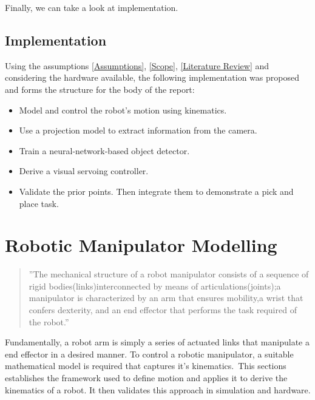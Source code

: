 \documentclass{UoNMCHA}
\numberwithin{equation}{section}
\begin{document}
Finally, we can take a look at implementation.
	
\subsection{Implementation}	

	Using the assumptions \ref{Assumptions}, \ref{Scope}, \ref{Literature Review} and considering the hardware available, the following implementation was proposed and forms the structure for the body of the report:
	
	\begin{itemize}
		\item Model and control the robot's motion using kinematics.
		\item Use a projection model to extract information from the camera.
		\item Train a neural-network-based object detector.
		\item Derive a visual servoing controller.
		\item Validate the prior points. Then integrate them to demonstrate a pick and place task.
	\end{itemize}
	

\newpage
\section{Robotic Manipulator Modelling}\label{sec:Core Section}

\begin{quote}
	''The mechanical structure of a robot manipulator consists of a sequence of rigid
	bodies(links)interconnected by means of articulations(joints);a manipulator is 
	characterized by an arm that ensures mobility,a wrist that confers dexterity, and an end 
	effector that performs the task required of the robot.'' \hfill \cite{siciliano2010robotics}
\end{quote}

Fundamentally, a robot arm is simply a series of actuated links that manipulate a end effector in a desired manner. To control a robotic manipulator, a suitable mathematical model is required that captures it's kinematics.\
This sections establishes the framework used to define motion and applies it to derive the kinematics of a robot. It then validates this approach in simulation and hardware.
\end{document}
